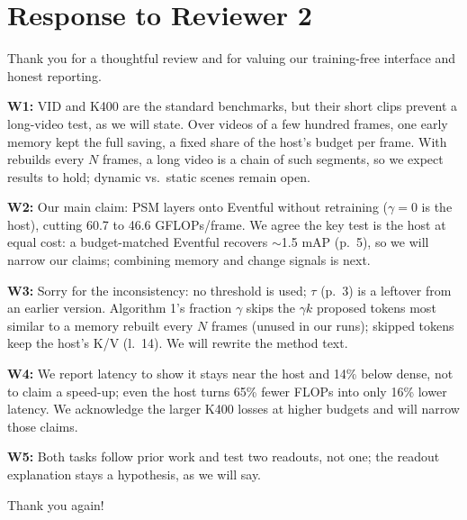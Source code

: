 \section*{Response to Reviewer 2}

Thank you for a thoughtful review and for valuing our training-free interface and honest reporting.

\textbf{W1:} VID and K400 are the standard benchmarks, but their short clips prevent a long-video test, as we will state. Over videos of a few hundred frames, one early memory kept the full saving, a fixed share of the host's budget per frame. With rebuilds every $N$ frames, a long video is a chain of such segments, so we expect results to hold; dynamic vs.\ static scenes remain open.

\textbf{W2:} Our main claim: PSM layers onto Eventful without retraining ($\gamma = 0$ is the host), cutting 60.7 to 46.6 GFLOPs/frame. We agree the key test is the host at equal cost: a budget-matched Eventful recovers $\sim$1.5 mAP (p.~5), so we will narrow our claims; combining memory and change signals is next.

\textbf{W3:} Sorry for the inconsistency: no threshold is used; $\tau$ (p.~3) is a leftover from an earlier version. Algorithm 1's fraction $\gamma$ skips the $\gamma k$ proposed tokens most similar to a memory rebuilt every $N$ frames (unused in our runs); skipped tokens keep the host's K/V (l.~14). We will rewrite the method text.

\textbf{W4:} We report latency to show it stays near the host and 14\% below dense, not to claim a speed-up; even the host turns 65\% fewer FLOPs into only 16\% lower latency. We acknowledge the larger K400 losses at higher budgets and will narrow those claims.

\textbf{W5:} Both tasks follow prior work and test two readouts, not one; the readout explanation stays a hypothesis, as we will say.

Thank you again!
